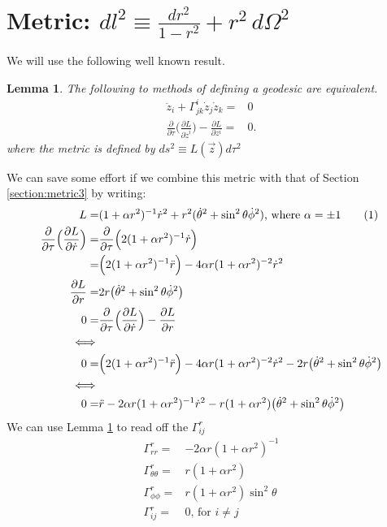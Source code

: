 \documentclass[]{article}
\newtheorem{lemma}{Lemma}
\newcommand\numberthis{\addtocounter{equation}{1}\tag{\theequation}}
\begin{document}
\section{Metric: $dl^2\equiv\frac{dr^2}{1-r^2}+r^2\,d\Omega^2$}
We will use the following well known result.
\begin{lemma}\label{lemma:geodesic}
	The following to methods of defining a geodesic are equivalent.
	\begin{align*}
	\ddot{z}_i + \Gamma^i_{jk}\dot{z}_j \dot{z}_k =& 0 \\
	\frac{\partial}{\partial \tau}\Big(\frac{\partial L}{\partial \dot{z}^i}\Big)-\frac{\partial L}{\partial z^i}=&0.
	\end{align*}
	where the metric is defined by $ds^2\equiv L(\vec{z}) d\tau^2$ 
\end{lemma}
We can save some effort if we combine this metric with that of Section \ref{section:metric3} by writing:
\begin{align*}
L=&(1+\alpha r^2)^{-1}\dot{r}^2 + r^2(\dot\theta^2 + \sin^2 \theta \dot \phi^2)\text{, where $\alpha=\pm 1$} \numberthis \label{eq:lagrangian1}\\
\frac{\partial}{\partial \tau}\Big(\frac{\partial L}{\partial \dot{r}}\Big)=&\frac{\partial}{\partial \tau}\Big(2(1+\alpha r^2)^{-1}\dot r\Big)\\
=& \Big(2(1+\alpha r^2)^{-1}\ddot r\Big)-4 \alpha r (1+\alpha r^2)^{-2}\dot{r}^2\\
\frac{\partial L}{\partial r}=&2r\big(\dot{\theta}^2 + \sin^2 \theta \dot \phi ^2\big)\\
0=&\frac{\partial}{\partial \tau}\Big(\frac{\partial L}{\partial \dot{r}}\Big)-\frac{\partial L}{\partial r}\\
\iff&\\
0=&	\Big(2(1+\alpha r^2)^{-1}\ddot r\Big)-4 \alpha r (1+\alpha r^2)^{-2}\dot{r}^2-2r\big(\dot{\theta}^2 + \sin^2 \theta \dot \phi ^2\big)\\
\iff&\\
0=&\ddot r-2 \alpha r (1+\alpha r^2)^{-1}\dot{r}^2-r(1+\alpha r^2)\big(\dot{\theta}^2 + \sin^2 \theta \dot \phi ^2\big)
\end{align*}
We can use Lemma \ref{lemma:geodesic} to read off the $\Gamma^r_{ij}$
\begin{align*}
\Gamma^r_{rr}=&-2 \alpha r (1+\alpha r^2)^{-1}\\
\Gamma^r_{\theta\theta}=&r(1+\alpha r^2)\\
\Gamma^r_{\phi\phi}=&r(1+\alpha r^2)\sin^2 \theta\\
\Gamma^r_{ij}=& 0\text{, for $i\ne j$}
\end{align*}
\end{document}
